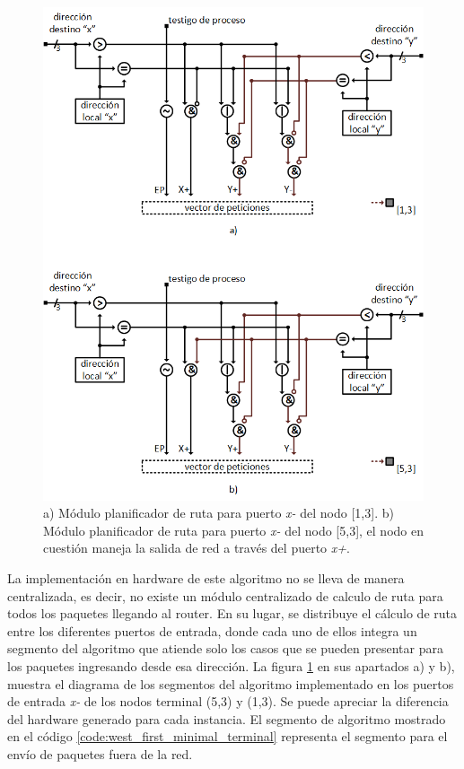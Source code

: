 \begin{figure}
	\begin{center}
		\includegraphics[scale=0.75]{figures/ch5_segmento_wfm.png}
	\end{center}
	\caption
		{	
			a) Módulo planificador de ruta para puerto \textit{x-} del nodo [1,3]. b) Módulo planificador de ruta para puerto \textit{x-} del nodo [5,3], el nodo en cuestión maneja la salida de red a través del puerto \textit{x+}.
		}
	\label{fig:ch5_segmento_wfm}
\end{figure}

La implementación en hardware de este algoritmo no se lleva de manera centralizada, es decir, no existe un módulo centralizado de calculo de ruta para todos los paquetes llegando al router. En su lugar, se distribuye el cálculo de ruta entre los diferentes puertos de entrada, donde cada uno de ellos integra un segmento del algoritmo que atiende solo los casos que se pueden presentar para los paquetes ingresando desde esa dirección. La figura \ref{fig:ch5_segmento_wfm} en sus apartados a) y b), muestra el diagrama de los segmentos del algoritmo implementado en los puertos de entrada \textit{x-} de los nodos terminal (5,3) y (1,3). Se puede apreciar la diferencia del hardware generado para cada instancia. El segmento de algoritmo mostrado en el código \ref{code:west_first_minimal_terminal} representa el segmento para el envío de paquetes fuera de la red.


